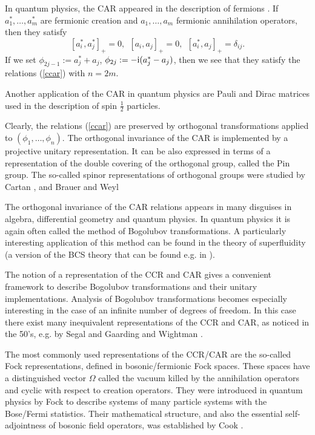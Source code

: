 \documentclass{svmult}
\def\i{{\rm i}}
\begin{document}
In quantum physics, the CAR appeared in the description of fermions \cite{JW}.
 If
$a_1^*,\dots,a_m^*$ are fermionic creation and
$a_1,\dots,a_m$ fermionic annihilation operators, then they satisfy
\[
[a_i^*,a_j^*]_+=0,\ \ [a_i,a_j]_+=0,\ \ [a_i^*,a_j]_+=\delta_{ij}.\]
If we set $\phi_{2j-1}:=a_j^*+a_j$, $\phi_{2j}:=-\i(a_j^*-a_j)$, then we
see that they satisfy the relations (\ref{ccar}) with $n=2m$.

Another application of the CAR in quantum physics are
Pauli  \cite{Pa} and Dirac  \cite{Di2} matrices
used in the description
 of spin $\frac12$ particles.

Clearly, the relations (\ref{ccar}) are preserved by orthogonal
transformations applied to $(\phi_1,\dots,\phi_n)$.
The orthogonal invariance of the CAR is implemented by 
  a projective unitary representation.
 It can be also expressed in terms of a representation of the
double covering of the orthogonal group, called the Pin group. 
The so-called spinor representations of orthogonal groups
 were studied by Cartan \cite{Ca}, and Brauer and Weyl \cite{BW}

The orthogonal invariance of the CAR relations appears in many disguises
in algebra,
differential geometry and quantum physics. 
In quantum physics it is again often called the method of Bogolubov 
transformations. A particularly interesting application of this method
can be found
in the theory of superfluidity (a version of 
the BCS theory that can be found e.g. in \cite{FW}). 


The  notion of a representation of the
 CCR and CAR gives a convenient framework to
describe Bogolubov transformations and their unitary implementations. Analysis
of Bogolubov transformations becomes especially interesting in the case of
an infinite number of degrees of freedom. In this case  there exist many
inequivalent representations of the CCR and CAR, as  noticed in the 50's,
e.g. by Segal \cite{Seg2} and
Gaarding and Wightman \cite{GaW}.  


The most commonly used representations of the CCR/CAR  are the so-called Fock
representations, defined in 
bosonic/fermionic Fock spaces. These spaces have a distinguished vector
$\Omega$ called the vacuum killed by the annihilation operators and
cyclic with respect to 
 creation operators. They were introduced in quantum physics by
Fock \cite{Fo} to describe systems of many particle systems with the
Bose/Fermi statistics. Their mathematical structure, and also the essential
self-adjointness of bosonic field operators,
 was established by Cook \cite{Coo}. 
\end{document}
